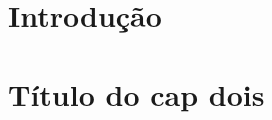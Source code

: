 \documentclass[12pt]{report}
\begin{document}











\normalsize
\tableofcontents
\newpage
\listoffigures
{}
\newpage
\listoftables
{}




\chapter{Introdução}

%
\chapter{Título do cap dois}

%
% 
%
% 
%
% 
%
% 


%
  
\end{document}
